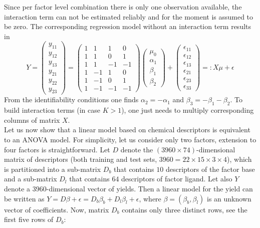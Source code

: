 \documentclass[12pt]{article}
\begin{document}
Since per factor level combination there is only one observation available, the interaction term can not be estimated reliably and for the moment is assumed to be zero. The corresponding regression model without an interaction term results in
$$
Y=\left(
\begin{matrix}
	y_{11}\\
	y_{12}\\
	y_{13}\\
	y_{21}\\
	y_{22}\\
	y_{23}
\end{matrix}
\right)=\left(
\begin{matrix}
	1&1&1&0\\
	1&1&0&1\\
	1&1&-1&-1\\
	1&-1&1&0\\
	1&-1&0&1\\
	1&-1&-1&-1
\end{matrix}
\right)\left(
\begin{matrix}
	\mu_0\\
	\alpha_1\\
	\beta_1\\
	\beta_2
\end{matrix}
\right)+\left(
\begin{matrix}
	\epsilon_{11}\\
	\epsilon_{12}\\
	\epsilon_{13}\\
	\epsilon_{21}\\
	\epsilon_{23}\\
	\epsilon_{33}
\end{matrix}
\right)=:X\mu+\epsilon
$$
From the identifiability conditions one finds $\alpha_2=-\alpha_1$ and $\beta_3=-\beta_1-\beta_2$. To build interaction terms (in case $K>1$), one just needs to multiply corresponding columns of matrix $X$.\\
Let us now show that a linear model based on chemical descriptors is equivalent to an ANOVA model. For simplicity, let us consider only two factors, extension to four factors is straightforward. Let $D$ denote the $(3960\times 74)$-dimensional matrix of descriptors (both training and test sets, $3960=22\times 15\times 3\times4$), which is partitioned into a sub-matrix $D_b$ that contains $10$ descriptors of the factor {\color{blue} base} and a sub-matrix $D_l$ that contains $64$ descriptors of factor {\color{blue} ligand}. Let also $Y$ denote a $3960$-dimensional vector of yields. Then a linear model for the yield can be written as $Y=D\beta+\epsilon=D_b\beta_b+D_l\beta_l+\epsilon$, where $\beta=(\beta_b,\beta_l)$ is an unknown vector of coefficients. Now, matrix $D_b$ contains only three distinct rows, see the first five rows of $D_b$:
\end{document}
